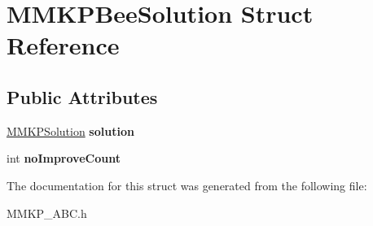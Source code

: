 \hypertarget{struct_m_m_k_p_bee_solution}{\section{M\+M\+K\+P\+Bee\+Solution Struct Reference}
\label{struct_m_m_k_p_bee_solution}
}
\subsection*{Public Attributes}
\begin{DoxyCompactItemize}
\item 
\hypertarget{struct_m_m_k_p_bee_solution_a6424a02862496caedb1a865116d70b15}{\hyperlink{class_m_m_k_p_solution}{M\+M\+K\+P\+Solution} {\bfseries solution}}\label{struct_m_m_k_p_bee_solution_a6424a02862496caedb1a865116d70b15}

\item 
\hypertarget{struct_m_m_k_p_bee_solution_a1fa2e1b8c830b6e0f989a4a59d41bd20}{int {\bfseries no\+Improve\+Count}}\label{struct_m_m_k_p_bee_solution_a1fa2e1b8c830b6e0f989a4a59d41bd20}

\end{DoxyCompactItemize}


The documentation for this struct was generated from the following file\+:\begin{DoxyCompactItemize}
\item 
M\+M\+K\+P\+\_\+\+A\+B\+C.\+h\end{DoxyCompactItemize}
